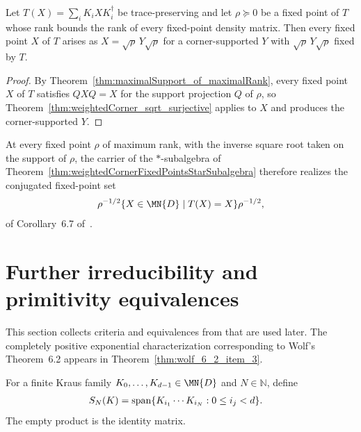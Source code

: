 \begin{theorem}%
    \label{thm:weightedCorner_sqrt_eq_of_maximalRank}
    \leanok
    Let $T(X)=\sum_iK_iXK_i^\dagger$ be trace-preserving and let
    $\rho\succeq0$ be a fixed point of $T$ whose rank bounds the rank of
    every fixed-point density matrix. Then every fixed point $X$ of $T$
    arises as $X=\sqrt{\rho}\,Y\sqrt{\rho}$ for a corner-supported $Y$ with
    $\sqrt{\rho}\,Y\sqrt{\rho}$ fixed by $T$.
\end{theorem}

\begin{proof}
    \leanok
    By Theorem~\ref{thm:maximalSupport_of_maximalRank}, every fixed point
    $X$ of $T$ satisfies $QXQ=X$ for the support projection $Q$ of $\rho$,
    so Theorem~\ref{thm:weightedCorner_sqrt_surjective} applies to $X$ and
    produces the corner-supported $Y$.
\end{proof}

At every fixed point $\rho$ of maximum rank, with the inverse square root
taken on the support of $\rho$, the carrier of the $*$-subalgebra of
Theorem~\ref{thm:weightedCornerFixedPointsStarSubalgebra} therefore realizes
the conjugated fixed-point set
\begin{align}
    \rho^{-1/2}
    \{X\in\MN{D}\mid T(X)=X\}
    \rho^{-1/2},
    \notag
\end{align}
of Corollary~6.7 of~\cite{Wolf2012Quantum}.

\section{Further irreducibility and primitivity equivalences}

This section collects criteria and equivalences from
\cite[Theorems~6.7 and~6.8]{Wolf2012Quantum} that are used later. The
completely positive exponential characterization corresponding to Wolf's
Theorem~6.2 appears in Theorem~\ref{thm:wolf_6_2_item_3}.

\begin{definition}
    \label{def:kraus_exact_word_span}
    \leanok
    For a finite Kraus family $K_0,\ldots,K_{d-1}\in\MN{D}$ and
    $N\in\mathbb N$, define
    \begin{align}
        S_N(K)&=\operatorname{span}\{K_{i_1}\cdots K_{i_N}:0\leq i_j<d\}.
        \notag
    \end{align}
    The empty product is the identity matrix.
\end{definition}

